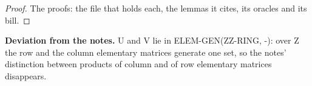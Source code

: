 %
\begin{proof}
%
The proofs: the file that holds each, the lemmas it cites, its oracles and its bill.
%
%
%
%
\end{proof}
%
\noindent\textbf{Deviation from the notes.} U and V lie in ELEM-GEN(ZZ-RING, -): over Z the row and the column elementary matrices generate one set, so the notes' distinction between products of column and of row elementary matrices disappears.
%
\renewcommand{\thethm}{3.38}
